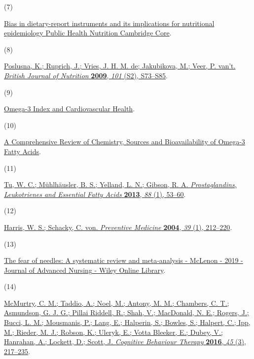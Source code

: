 \documentclass[journal=jacsat,manuscript=article]{achemso}
\newlength{\cslhangindent}
\newlength{\csllabelwidth}
\newenvironment{CSLReferences}[2] %
 {\begin{list}{}{%
  \setlength{\itemindent}{0pt}
  \setlength{\leftmargin}{0pt}
  \setlength{\parsep}{0pt}
  \ifodd #1
   \setlength{\leftmargin}{\cslhangindent}
   \setlength{\itemindent}{-1\cslhangindent}
  \fi
  \setlength{\itemsep}{#2\baselineskip}}}
 {\end{list}}
\newcommand{\CSLLeftMargin}[1]{\parbox[t]{\csllabelwidth}{#1}}
\newcommand{\CSLRightInline}[1]{\parbox[t]{\linewidth - \csllabelwidth}{#1}\break}
\begin{document}
\begin{CSLReferences}{0}{0}
\CSLLeftMargin{(7) }%
\CSLRightInline{\href{https://www.cambridge.org/core/journals/public-health-nutrition/article/bias-in-dietaryreport-instruments-and-its-implications-for-nutritional-epidemiology/F74F7C0AF47FDD40061A3684DA658731}{Bias
in dietary-report instruments and its implications for nutritional
epidemiology {\textbar} {Public} {Health} {Nutrition} {\textbar}
{Cambridge} {Core}}.}

\CSLLeftMargin{(8) }%
\CSLRightInline{\href{https://doi.org/10.1017/S0007114509990602}{Poslusna,
K.; Ruprich, J.; Vries, J. H. M. de; Jakubikova, M.; Veer, P. van't.
\emph{British Journal of Nutrition} \textbf{2009}, \emph{101} (S2),
S73--S85}.}

\CSLLeftMargin{(9) }%
\CSLRightInline{\href{https://www.mdpi.com/2072-6643/6/2/799?uid=563b4f0a2a}{Omega-3
{Index} and {Cardiovascular} {Health}}.}

\CSLLeftMargin{(10) }%
\CSLRightInline{\href{https://www.mdpi.com/2072-6643/10/11/1662}{A
{Comprehensive} {Review} of {Chemistry}, {Sources} and {Bioavailability}
of {Omega}-3 {Fatty} {Acids}}.}

\CSLLeftMargin{(11) }%
\CSLRightInline{\href{https://doi.org/10.1016/j.plefa.2012.04.005}{Tu,
W. C.; Mühlhäusler, B. S.; Yelland, L. N.; Gibson, R. A.
\emph{Prostaglandins, Leukotrienes and Essential Fatty Acids}
\textbf{2013}, \emph{88} (1), 53--60}.}

\CSLLeftMargin{(12) }%
\CSLRightInline{\href{https://doi.org/10.1016/j.ypmed.2004.02.030}{Harris,
W. S.; Schacky, C. von. \emph{Preventive Medicine} \textbf{2004},
\emph{39} (1), 212--220}.}

\CSLLeftMargin{(13) }%
\CSLRightInline{\href{https://onlinelibrary.wiley.com/doi/full/10.1111/jan.13818}{The
fear of needles: {A} systematic review and meta‐analysis - {McLenon} -
2019 - {Journal} of {Advanced} {Nursing} - {Wiley} {Online} {Library}}.}

\CSLLeftMargin{(14) }%
\CSLRightInline{\href{https://doi.org/10.1080/16506073.2016.1157204}{McMurtry,
C. M.; Taddio, A.; Noel, M.; Antony, M. M.; Chambers, C. T.; Asmundson,
G. J. G.; Pillai Riddell, R.; Shah, V.; MacDonald, N. E.; Rogers, J.;
Bucci, L. M.; Mousmanis, P.; Lang, E.; Halperin, S.; Bowles, S.;
Halpert, C.; Ipp, M.; Rieder, M. J.; Robson, K.; Uleryk, E.; Votta
Bleeker, E.; Dubey, V.; Hanrahan, A.; Lockett, D.; Scott, J.
\emph{Cognitive Behaviour Therapy} \textbf{2016}, \emph{45} (3),
217--235}.}


\end{CSLReferences}
\end{document}
